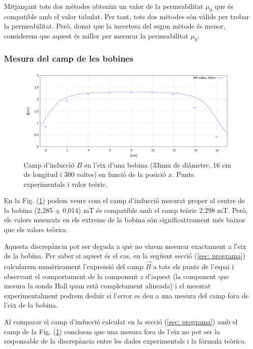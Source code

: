 \documentclass[11pt]{article}
\numberwithin{equation}{section}
\numberwithin{figure}{section}
\numberwithin{table}{section}
\begin{document}
Mitjançant tots dos mètodes obtenim un valor de la permeabilitat $\mu_0$ que és compatible amb el valor tabulat. Per tant, tots dos mètodes són vàlids per trobar la permeabilitat. Però, donat que la incertesa del segon mètode és menor, considerem que aquest és millor per mesurar la permeabilitat $\mu_0$.


\subsubsection{Mesura del camp de les bobines}\label{subsec: bobines}

\begin{figure}[H]
    \centering
    \includegraphics[width=0.75\linewidth]{Bobina 1.PNG}
    \caption{Camp d'inducció $B$ en l'eix d'una bobina (33mm de diàmetre, 16 cm de longitud i 300 voltes) en funció de la posició $x$. Punts experimentals i valor teòric.}
    \label{fig: BvsX_33mm}
\end{figure}

En la Fig. (\ref{fig: BvsX_33mm}) podem veure com el camp d'inducció mesurat proper al centre de la bobina (2,285 $\pm$ 0,014) mT és compatible amb el camp teòric 2,298 mT. Però, els valors mesurats en els extrems de la bobina són significativament més baixos que els valors teòrics.

Aquesta discrepància pot ser deguda a què no vàrem mesurar exactament a l'eix de la bobina. Per saber si aquest és el cas, en la següent secció (\ref{sec: programa}) calcularem numèricament l'expressió del camp $\vec{B}$ a tots els punts de l'espai i observant el comportament de la component $z$ d'aquest (la component que mesura la sonda Hall quan està completament alineada) i el mesurat experimentalment podrem deduir si l'error es deu a una mesura del camp fora de l'eix de la bobina. 

Al comparar el camp d'inducció calculat en la secció (\ref{sec: programa}) amb el camp de la Fig. (\ref{fig: BvsX_33mm}) concloem que una mesura fora de l'eix no pot ser la responsable de la discrepància entre les dades experimentals i la fórmula teòrica.
\end{document}
